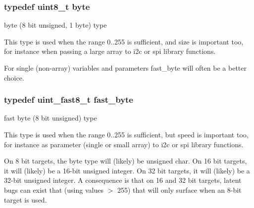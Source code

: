 \subsubsection[{\texorpdfstring{byte}{byte}}]{\setlength{\rightskip}{0pt plus 5cm}typedef uint8\+\_\+t {\bf byte}}\hypertarget{hwlib-defines_8hpp_ab8ef12fab634c171394422d0ee8baf94}{}\label{hwlib-defines_8hpp_ab8ef12fab634c171394422d0ee8baf94}


byte (8 bit unsigned, 1 byte) type 

This type is used when the range 0..255 is sufficient, and size is important too, for instance when passing a large array to i2c or spi library functions.

For single (non-\/array) variables and parameters fast\+\_\+byte will often be a better choice. 
\subsubsection[{\texorpdfstring{fast\+\_\+byte}{fast_byte}}]{\setlength{\rightskip}{0pt plus 5cm}typedef uint\+\_\+fast8\+\_\+t {\bf fast\+\_\+byte}}\hypertarget{hwlib-defines_8hpp_a54998f25522db04b7b797b0fcc9eb3d5}{}\label{hwlib-defines_8hpp_a54998f25522db04b7b797b0fcc9eb3d5}


fast byte (8 bit unsigned) type 

This type is used when the range 0..255 is sufficient, but speed is important too, for instance as parameter (single or small array) to i2c or spi library functions.

On 8 bit targets, the byte type will (likely) be unsigned char. On 16 bit targets, it will (likely) be a 16-\/bit unsigned integer. On 32 bit targets, it will (likely) be a 32-\/bit unsigned integer. A consequence is that on 16 and 32 bit targets, latent bugs can exist that (using values $>$ 255) that will only surface when an 8-\/bit target is used. 